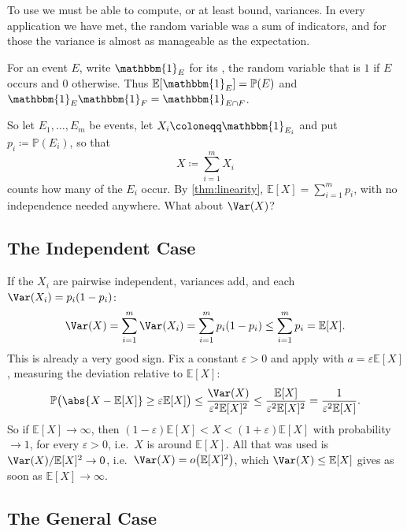 To use  we must be able to compute, or at least bound, variances. In every application we have met, the random variable was a sum of indicators, and for those the variance is almost as manageable as the expectation.

\begin{notation}
    For an event \(E\), write \(\mathbbm{1}_{E}\) for its , the random variable that is \(1\) if \(E\) occurs and \(0\) otherwise. Thus \(\mathbb{E}[\mathbbm{1}_{E}] = \mathbb{P}(E)\) and \(\mathbbm{1}_{E} \mathbbm{1}_{F} = \mathbbm{1}_{E \cap F}\).
\end{notation}

So let \(E_1, \ldots, E_m\) be events, let \(X_i \coloneqq \mathbbm{1}_{E_i}\) and put \(p_i \coloneqq \mathbb{P}(E_i)\), so that
\[
    X \coloneqq \sum_{i=1}^{m} X_i
\]
counts how many of the \(E_i\) occur. By \autoref{thm:linearity}, \(\mathbb{E}[X] = \sum_{i=1}^{m} p_i\), with no independence needed anywhere. What about \(\Var(X)\)?

\subsection{The Independent Case}

If the \(X_i\) are pairwise independent, variances add, and each \(\Var(X_i) = p_i(1-p_i)\):
\[
    \Var(X) = \sum_{i=1}^{m} \Var(X_i) = \sum_{i=1}^{m} p_i (1 - p_i) \le \sum_{i=1}^{m} p_i = \mathbb{E}[X].
\]
This is already a very good sign. Fix a constant \(\varepsilon > 0\) and apply  with \(a = \varepsilon \mathbb{E}[X]\), measuring the deviation relative to \(\mathbb{E}[X]\):
\[
    \mathbb{P}\bigl( \abs{X - \mathbb{E}[X]} \ge \varepsilon \mathbb{E}[X] \bigr)
    \le \frac{\Var(X)}{\varepsilon^{2} \mathbb{E}[X]^{2}}
    \le \frac{\mathbb{E}[X]}{\varepsilon^{2} \mathbb{E}[X]^{2}}
    = \frac{1}{\varepsilon^{2} \mathbb{E}[X]}.
\]
So if \(\mathbb{E}[X] \to \infty\), then \((1 - \varepsilon) \mathbb{E}[X] < X < (1 + \varepsilon) \mathbb{E}[X]\) with probability \(\to 1\), for every \(\varepsilon > 0\), i.e.\ \(X\) is  around \(\mathbb{E}[X]\). All that was used is \(\Var(X) / \mathbb{E}[X]^{2} \to 0\), i.e.\ \(\Var(X) = o\bigl( \mathbb{E}[X]^{2} \bigr)\), which \(\Var(X) \le \mathbb{E}[X]\) gives as soon as \(\mathbb{E}[X] \to \infty\).

\subsection{The General Case}

